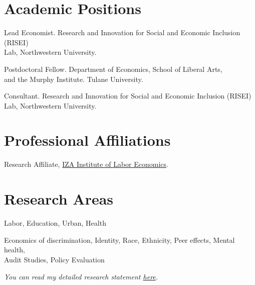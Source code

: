 \documentclass[letterpaper]{article}
\renewenvironment{itemize}{
  \begin{list}{}{
    \setlength{\leftmargin}{1.5em}
  }
}{
  \end{list}
}
\begin{document}
\section*{Academic Positions}
\vspace{2 mm}
\begin{itemize}
  \item {} Lead Economist. Research and Innovation for Social and Economic Inclusion (RISEI) \\{\makebox[1.8cm]{\hfill}} Lab, Northwestern University.
  \item {} Postdoctoral Fellow. Department of Economics, School of Liberal Arts, \\{\makebox[1.8cm]{\hfill}} and the Murphy Institute. Tulane University.
  \item {} Consultant. Research and Innovation for Social and Economic Inclusion (RISEI) \\{\makebox[1.8cm]{\hfill}} Lab, Northwestern University.
\end{itemize}
\vspace{2 mm}

\section*{Professional Affiliations}
\vspace{2 mm}
\begin{itemize}
  \item {} Research Affiliate, \href{https://www.iza.org/person/34828/hussain-hadah}{IZA Institute of Labor Economics}.
\end{itemize}
\vspace{2 mm}

\section*{Research Areas}
\vspace{2 mm}
\begin{itemize}
\item {} Labor, Education, Urban, Health
\item {} Economics of discrimination, Identity, Race, Ethnicity, Peer effects, Mental health, \\{\makebox[2.5cm]{\hfill}} Audit Studies, Policy Evaluation
\item \textit{You can read my detailed research statement \href{https://hhadah.github.io/statements/Hadah_Research.pdf}{here}.}
\end{itemize}
\vspace{2 mm}
\end{document}

